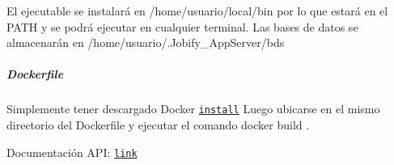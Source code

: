 El ejecutable se instalará en {\ttfamily /home/usuario/local/bin} por lo que estará en el {\ttfamily P\+A\+TH} y se podrá ejecutar en cualquier terminal. Las bases de datos se almacenarán en {\ttfamily /home/usuario/.Jobify\+\_\+\+App\+Server/bds}

\subparagraph*{Dockerfile}

Simplemente tener descargado Docker \href{https://docs.docker.com/engine/installation/linux/ubuntulinux/}{\tt install} Luego ubicarse en el mismo directorio del {\ttfamily Dockerfile} y ejecutar el comando {\ttfamily docker build .}

Documentación A\+PI\+: \href{http://rebilly.github.io/ReDoc/?url=https://raw.githubusercontent.com/alelevinas/Jobify_AppServer/master/jobify-appserver-serverAPI.yaml}{\tt link} 